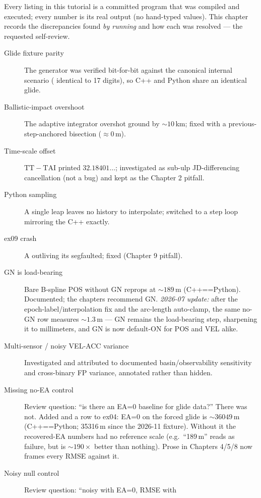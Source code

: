 Every listing in this tutorial is a committed program that was compiled
and executed; every number is its real output (no hand-typed values). This
chapter records the discrepancies found \emph{by running} and how each was
resolved --- the requested self-review.

\begin{description}
\item[Glide fixture parity] The generator was verified bit-for-bit against
the canonical internal scenario ( identical to 17 digits),
so C++ and Python share an identical glide.
\item[Ballistic-impact overshoot] The adaptive integrator overshot ground
by ${\sim}10\,$km; fixed with a previous-step-anchored bisection
(${\approx}0\,$m).
\item[Time-scale offset] $\mathrm{TT}-\mathrm{TAI}$ printed
$32.18401\ldots$; investigated as sub-ulp JD-differencing cancellation
(not a bug) and kept as the Chapter 2 pitfall.
\item[Python sampling] A single  leap leaves no history
to interpolate; switched to a step loop mirroring the C++ exactly.
\item[ex09 crash] A  outliving its
 segfaulted; fixed (Chapter 9 pitfall).
\item[GN is load-bearing] Bare B-spline POS without GN reprops at
${\sim}189\,$m (C++==Python). Documented; the chapters recommend GN.
\emph{2026-07 update:} after the epoch-label/interpolation fix and the
arc-length auto-clamp, the same no-GN row measures ${\sim}1.3\,$m --- GN
remains the load-bearing step, sharpening it to millimeters, and GN is now
default-ON for POS and VEL alike.
\item[Multi-sensor / noisy VEL-ACC variance] Investigated and attributed
to documented basin/observability sensitivity and cross-binary FP
variance, annotated rather than hidden.
\item[Missing no-EA control] Review question: ``is there an EA=0 baseline
for glide data?'' There was not. Added  and a
 row to ex04: EA=0 on the forced glide is
${\sim}36049\,$m (C++==Python; 35316\,m since the 2026-11 fixture). Without it the recovered-EA numbers had no
reference scale (e.g.\ ``189\,m'' reads as failure, but is ${\sim}190\times$
better than nothing). Prose in Chapters 4/5/8 now frames every RMSE
against it.
\item[Noisy null control] Review question: ``noisy with EA=0, RMSE with

\end{description}
